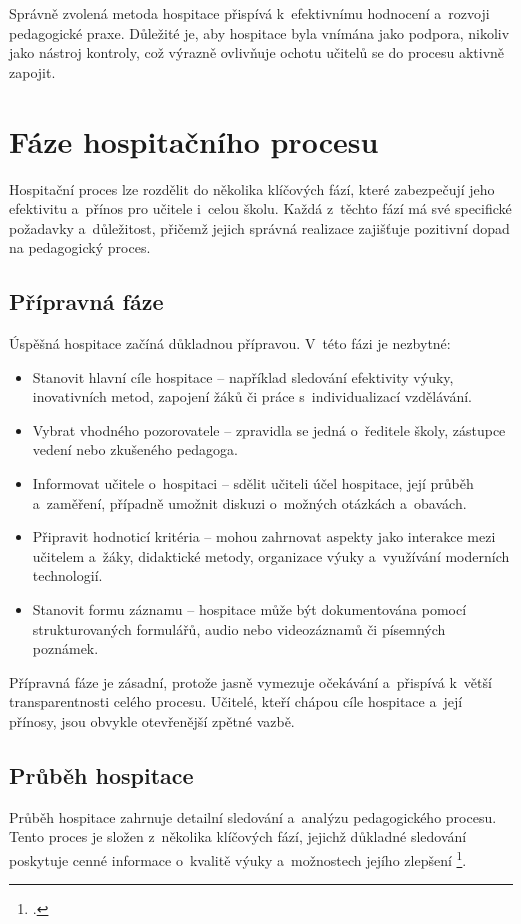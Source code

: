 Správně zvolená metoda hospitace přispívá k~efektivnímu hodnocení a~rozvoji pedagogické praxe. Důležité je, aby hospitace byla vnímána jako podpora, nikoliv jako nástroj kontroly, což výrazně ovlivňuje ochotu učitelů se do procesu aktivně zapojit.


\section{Fáze hospitačního procesu}

Hospitační proces lze rozdělit do několika klíčových fází, které zabezpečují jeho efektivitu a~přínos pro učitele i~celou školu. Každá z~těchto fází má své specifické požadavky a~důležitost, přičemž jejich správná realizace zajišťuje pozitivní dopad na pedagogický proces.

\subsection{Přípravná fáze}

Úspěšná hospitace začíná důkladnou přípravou. V~této fázi je nezbytné:

\begin{itemize}
    \item Stanovit hlavní cíle hospitace – například sledování efektivity výuky, inovativních metod, zapojení žáků či práce s~individualizací vzdělávání.
    \item Vybrat vhodného pozorovatele – zpravidla se jedná o~ředitele školy, zástupce vedení nebo zkušeného pedagoga.
    \item Informovat učitele o~hospitaci – sdělit učiteli účel hospitace, její průběh a~zaměření, případně umožnit diskuzi o~možných otázkách a~obavách.
    \item Připravit hodnoticí kritéria – mohou zahrnovat aspekty jako interakce mezi učitelem a~žáky, didaktické metody, organizace výuky a~využívání moderních technologií.
    \item Stanovit formu záznamu – hospitace může být dokumentována pomocí strukturovaných formulářů, audio nebo videozáznamů či písemných poznámek.
\end{itemize}

Přípravná fáze je zásadní, protože jasně vymezuje očekávání a~přispívá k~větší transparentnosti celého procesu. Učitelé, kteří chápou cíle hospitace a~její přínosy, jsou obvykle otevřenější zpětné vazbě.

\subsection{Průběh hospitace}
Průběh hospitace zahrnuje detailní sledování a~analýzu pedagogického procesu. Tento proces je složen z~několika klíčových fází, jejichž důkladné sledování poskytuje cenné informace o~kvalitě výuky a~možnostech jejího zlepšení \footcite[132]{ped-proces-rizeni}.

